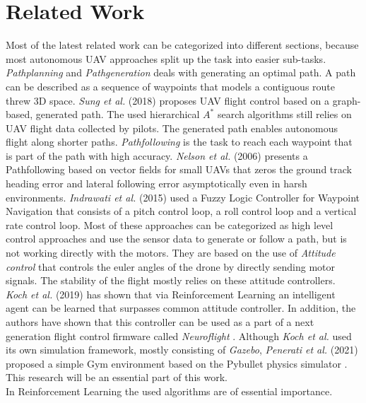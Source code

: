 \section{Related Work}
Most of the latest related work can be categorized into different sections,
because most autonomous UAV approaches split up the task into easier sub-tasks. 
\emph{Pathplanning} and \emph{Pathgeneration} deals with generating
an optimal path. A path can be described as a sequence of waypoints that models
a contiguous route threw 3D space. 
\emph{Sung et al.} (2018) \cite{kwak2018autonomous} proposes UAV flight control
based on a graph-based, generated path. The used hierarchical $A^*$ search
algorithms still relies on UAV flight data collected by pilots.
The generated path enables autonomous flight along shorter paths. 
\emph{Pathfollowing} is the task to reach each waypoint that is part of the path
with high accuracy. 
\emph{Nelson et al.} (2006) \cite{1657648} presents a Pathfollowing based
on vector fields for small UAVs that zeros the ground track heading error
and lateral following error asymptotically even in harsh environments. 
\emph{Indrawati et al.} (2015) 
\cite{indrawati2015waypoint}
used a Fuzzy Logic Controller for Waypoint Navigation that consists of 
a pitch control loop, a roll control loop and a vertical rate control loop.
Most of these approaches can be categorized as high level control approaches and
use the sensor data to generate or follow a path, but is not working directly
with the motors. They are based on the use of \emph{Attitude control} that controls 
the euler angles of the drone by directly sending motor signals.
The stability of the flight mostly relies on these attitude controllers.\\
\newline
\emph{Koch et al.} (2019) \cite{koch2019reinforcement} has shown that via 
Reinforcement Learning an intelligent agent can be learned that surpasses 
common attitude controller.
In addition, the authors have shown that this controller can be used as a part of 
a next generation flight control firmware called \emph{Neuroflight} \cite{koch2019neuroflight}.
Although \emph{Koch et al.} used its own simulation framework, mostly consisting
of \emph{Gazebo}, \emph{Penerati et al.} (2021) \cite{panerati2021learning} proposed
a simple Gym environment based on the Pybullet physics simulator \cite{coumans2021}.
This research will be an essential part of this work.\\
\newline
In Reinforcement Learning the used algorithms are of essential importance.
